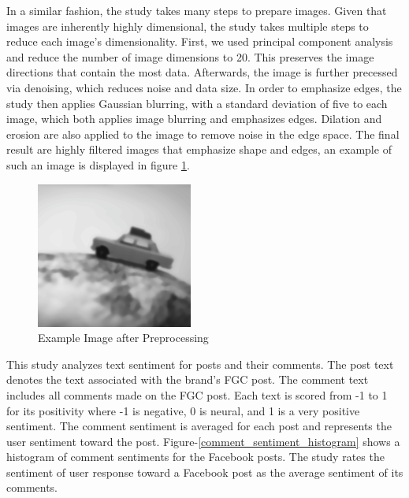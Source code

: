 \documentclass[mksc,blindrev]{informs3} %
\begin{document}
In a similar fashion, the study takes many steps to prepare images. Given that images are inherently highly dimensional, the study takes multiple steps to reduce each image's dimensionality. First, we used principal component analysis and reduce the number of image dimensions to 20. This preserves the image directions that contain the most data. Afterwards, the image is further precessed via denoising, which reduces noise and data size. In order to emphasize edges, the study then applies Gaussian blurring, with a standard deviation of five to each image, which both applies image blurring and emphasizes edges. Dilation and erosion are also applied to the image to remove noise in the edge space. The final result are highly filtered images that emphasize shape and edges, an example of such an image is displayed in figure \ref{processed_image}. 

\begin{figure}
\centering
\includegraphics[width=\columnwidth]{images/preprocessed_image.png}
\caption{Example Image after Preprocessing}
\label{processed_image}
\end{figure}

This study analyzes text sentiment for posts and their comments. The post text denotes the text associated with the brand's FGC post. The comment text includes all comments made on the FGC post. Each text is scored from -1 to 1 for its positivity where -1 is negative, 0 is neural, and 1 is a very positive sentiment. The comment sentiment is averaged for each post and represents the user sentiment toward the post. Figure-\ref{comment_sentiment_histogram} shows a histogram of comment sentiments for the Facebook posts. The study rates the sentiment of user response toward a Facebook post as the average sentiment of its comments.
\end{document}
